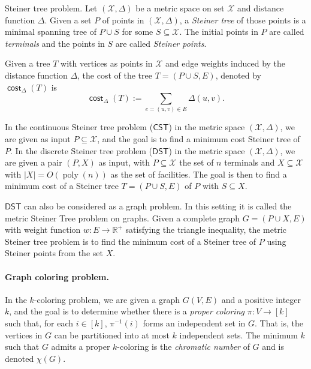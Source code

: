 \documentclass{theoretics}
\DeclareMathOperator{\cost}{\mathsf{cost}}
\DeclareMathOperator{\poly}{poly}
\newcommand{\1}{\textbf{1}}
\newcommand{\cst}{$\mathsf{CST}$\xspace}
\newcommand{\dst}{$\mathsf{DST}$\xspace}
\begin{document}
\begin{paragraph}{Steiner tree problem.}  Let  $(\mathcal{X}, \Delta)$ be a metric space on set $\mathcal{X}$ and distance function $\Delta$. 
Given a set $P$ of points in $(\mathcal{X}, \Delta)$, a \textit{Steiner tree} of those points is a minimal spanning tree of $P \cup S$ for some $S\subseteq \mathcal{X}$. The initial points in $P$ are called \textit{terminals} and the points in $S$ are called \textit{Steiner points}. 

Given a tree $T$ with vertices as points in $\mathcal{X}$ and edge weights induced by the distance function $\Delta$, the cost of the tree $T = (P \cup S, E)$, denoted by $\cost_{\Delta}(T)$ is 
\[
 \cost_{\Delta}(T):=\sum_{e = (u,v) \in E} \Delta(u, v).
\]


In the continuous Steiner tree problem (\cst) in the metric space $(\mathcal{X}, \Delta)$, we are given as input $P \subseteq \mathcal{X}$, and the goal is to find a minimum cost Steiner tree of $P$. In the discrete Steiner tree problem (\dst) in the metric space $(\mathcal{X}, \Delta)$, we are given a pair $(P, X)$ as input, with $P \subseteq \mathcal{X}$ the set of $n$ terminals and $X \subseteq \mathcal{X}$ with $|X| = O(\poly(n))$ as the set of facilities. The goal is then to find a minimum cost of a Steiner tree $T = (P \cup S, E)$ of $P$ with  $S \subseteq X$.



\dst can also be considered as a graph problem. In this setting it is called the metric Steiner Tree problem on graphs. Given a complete graph $G = (P \cup X, E)$ with weight function $w : E \to \mathbb{R}^{+}$ satisfying the triangle inequality, the metric Steiner tree problem is to find the minimum cost of a Steiner tree of $P$ using Steiner points from the set $X$.
\end{paragraph}

\paragraph{Graph coloring problem.} In the $k$-coloring problem, we are given a graph $G(V,E)$ and a positive integer $k$, and the goal is to determine whether there is a \textit{proper coloring} $\pi: V \to [k]$ such that, for each $i \in [k]$, $\pi^{-1}(i)$ forms an independent set in $G$. That is, the vertices in $G$ can be partitioned into at most $k$ independent sets. The minimum $k$ such that $G$ admits a proper $k$-coloring is the \textit{chromatic number} of $G$ and is denoted $\chi(G)$.
\end{document}

